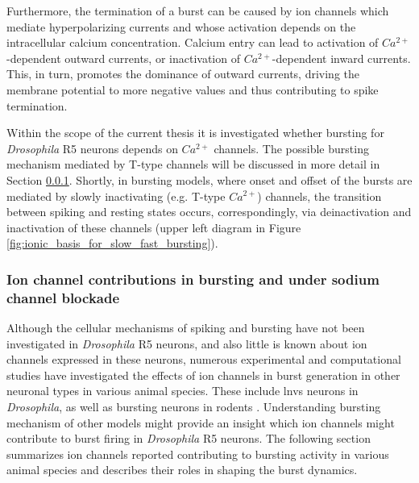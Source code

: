 \documentclass[../main.tex]{subfiles}
\begin{document}
Furthermore, the termination of a burst can be caused by ion channels which mediate hyperpolarizing currents and whose activation depends on the intracellular calcium concentration. Calcium entry can lead to activation of $Ca^{2+}$-dependent outward currents, or inactivation of $Ca^{2+}$-dependent inward currents. This, in turn, promotes the dominance of outward currents, driving the membrane potential to more negative values and thus contributing to spike termination.

Within the scope of the current thesis it is investigated whether bursting for \textit{Drosophila} R5 neurons depends on $Ca^{2+}$ channels. The possible bursting mechanism mediated by T-type channels will be discussed in more detail in Section \ref{subsubsec:ion_channel_contributions}. Shortly, in bursting models, where onset and offset of the bursts are mediated by slowly inactivating (e.g. T-type $Ca^{2+}$) channels, the transition between spiking and resting states occurs, correspondingly, via deinactivation and inactivation of these channels (upper left diagram in Figure \ref{fig:ionic_basis_for_slow_fast_bursting}).


\subsubsection{Ion channel contributions in bursting and under sodium channel blockade} \label{subsubsec:ion_channel_contributions}

Although the cellular mechanisms of spiking and bursting have not been investigated in \textit{Drosophila} R5 neurons, and also little is known about ion channels expressed in these neurons, numerous experimental and computational studies have investigated the effects of ion channels in burst generation in other neuronal types in various animal species. These include \glspl{lnv} neurons in \textit{Drosophila}, as well as bursting neurons in rodents \cite{vickstromTTypeCalciumChannels2020,golombContributionPersistentNa2006,liuMultipleConductancesCooperatively2008,wangMultipleDynamicalModes1994,mccormickModelElectrophysiologicalProperties1992}. Understanding bursting mechanism of other models might provide an insight which ion channels might contribute to burst firing in \textit{Drosophila} R5 neurons. The following section summarizes ion channels reported contributing to bursting activity in various animal species and describes their roles in shaping the burst dynamics.
\end{document}
